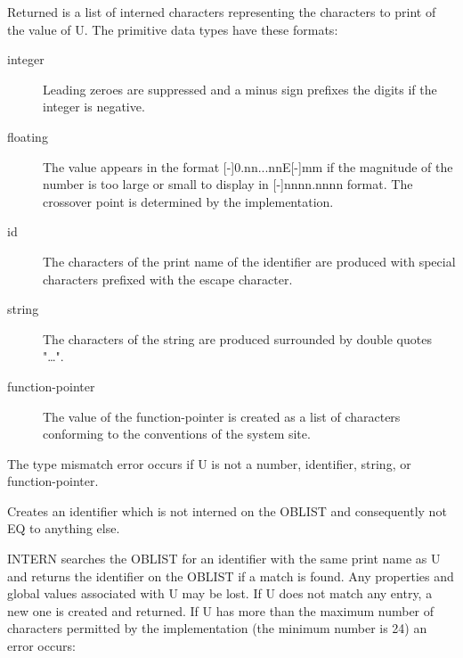 {Returned is a list of interned characters representing the characters
to print of the value of U. The primitive data types have these
formats:

\begin{description}
\item[integer]  Leading zeroes are suppressed and
a minus sign prefixes the digits if the integer is negative.

\item[floating]  The value appears in the format
[-]0.nn...nnE[-]mm if the magnitude of the number is too large or
small to display in [-]nnnn.nnnn format. The crossover point is
determined by the implementation.

\item[id]  The characters of the print name of the
identifier are produced with special characters prefixed with the
escape character.

\item[string]  The characters of the string are
produced surrounded by double quotes "\ldots".

\item[function-pointer]  The value of the
function-pointer is created as a list of characters conforming to the
conventions of the system site.
\end{description}

The type mismatch error occurs if U is not a number, identifier,
string, or function-pointer. }


{Creates an identifier which is not interned on the OBLIST and
consequently not EQ to anything else.  }


{INTERN searches the OBLIST for an identifier with the same print name
as U and returns the identifier on the OBLIST if a match is found.
Any properties and global values associated with U may be lost. If U
does not match any entry, a new one is created and returned. If U has
more than the maximum number of characters permitted by the
implementation (the minimum number is 24) an error occurs:

}



